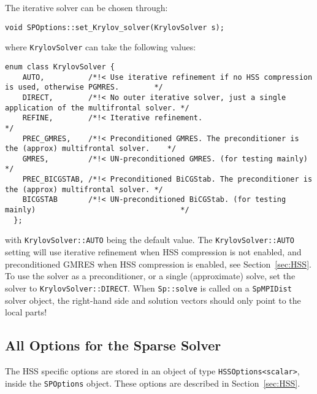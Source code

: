 \documentclass{article}
\begin{document}
The iterative solver can be chosen through:
\begin{lstlisting}[style=C]
  void SPOptions::set_Krylov_solver(KrylovSolver s);
\end{lstlisting}
where \lstinline[style=C]!KrylovSolver! can take the following values:
\begin{lstlisting}[style=C]
  enum class KrylovSolver {
    AUTO,          /*!< Use iterative refinement if no HSS compression is used, otherwise PGMRES.        */
    DIRECT,        /*!< No outer iterative solver, just a single application of the multifrontal solver. */
    REFINE,        /*!< Iterative refinement.                                                            */
    PREC_GMRES,    /*!< Preconditioned GMRES. The preconditioner is the (approx) multifrontal solver.    */
    GMRES,         /*!< UN-preconditioned GMRES. (for testing mainly)                                    */
    PREC_BICGSTAB, /*!< Preconditioned BiCGStab. The preconditioner is the (approx) multifrontal solver. */
    BICGSTAB       /*!< UN-preconditioned BiCGStab. (for testing mainly)                                 */
  };
\end{lstlisting}
with \lstinline[style=C]!KrylovSolver::AUTO! being the default value.
The \lstinline[style=C]!KrylovSolver::AUTO! setting will use iterative
refinement when HSS compression is not enabled, and preconditioned
GMRES when HSS compression is enabled, see Section~\ref{sec:HSS}.  To
use the solver as a preconditioner, or a single (approximate) solve,
set the solver to \lstinline[style=C]!KrylovSolver::DIRECT!. When
\lstinline[style=C]!Sp::solve! is called on a
\lstinline[style=C]!SpMPIDist! solver object, the right-hand side and
solution vectors should only point to the local parts!


\subsection{All Options for the Sparse Solver}
The HSS specific options are stored in an object of type
\lstinline[style=C]!HSSOptions<scalar>!, inside the
\lstinline[style=C]!SPOptions! object. These options are described in
Section~\ref{sec:HSS}.
\end{document}
